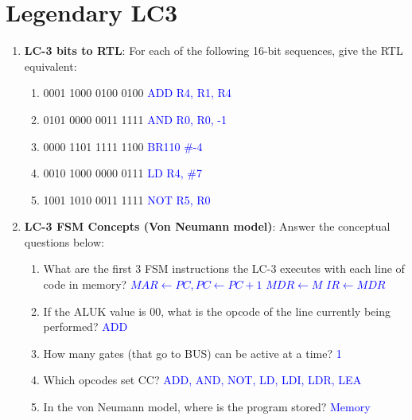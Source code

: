 \documentclass{article}
\begin{document}
\newpage
\section{Legendary LC3}
    \begin{enumerate}[label=(\alph*)]
        \item \textbf{LC-3 bits to RTL}: For each of the following 16-bit sequences, give the RTL equivalent:
        \begin{enumerate}[label=(\roman*),itemsep = 10pt]
            \item 0001 1000 0100 0100 \textcolor{blue}{ADD R4, R1, R4}
            \item 0101 0000 0011 1111 \textcolor{blue}{AND R0, R0, -1}
            \item 0000 1101 1111 1100 \textcolor{blue}{BR{110} \#-4}
            \item 0010 1000 0000 0111 \textcolor{blue}{LD R4, \#7}
            \item 1001 1010 0011 1111 \textcolor{blue}{NOT R5, R0}
        \end{enumerate}
        \item \textbf{LC-3 FSM Concepts (Von Neumann model)}: Answer the conceptual questions below:
        \begin{enumerate}[label=(\roman*),itemsep = 10pt]
            \item What are the first 3 FSM instructions the LC-3 executes with each line of code in memory?
            \newline \textcolor{blue}{$MAR \leftarrow PC, PC\leftarrow PC+1$ \newline $MDR \leftarrow M$ \newline $IR \leftarrow MDR$}
            \item If the ALUK value is 00, what is the opcode of the line currently being performed?
            \newline \textcolor{blue}{ADD}
            \item How many gates (that go to BUS) can be active at a time?
            \newline \textcolor{blue}{1}
            \item Which opcodes set CC?
            \newline \textcolor{blue}{ADD, AND, NOT, LD, LDI, LDR, LEA}
            \item In the von Neumann model, where is the program stored?
            \newline \textcolor{blue}{Memory}
            

\end{enumerate}
\end{enumerate}
\end{document}
